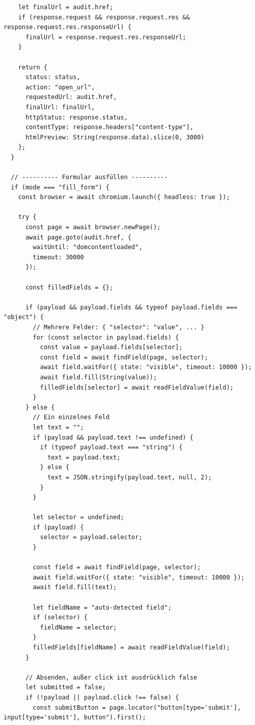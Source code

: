 \begin{lstlisting}
    let finalUrl = audit.href;
    if (response.request && response.request.res && response.request.res.responseUrl) {
      finalUrl = response.request.res.responseUrl;
    }

    return {
      status: status,
      action: "open_url",
      requestedUrl: audit.href,
      finalUrl: finalUrl,
      httpStatus: response.status,
      contentType: response.headers["content-type"],
      htmlPreview: String(response.data).slice(0, 3000)
    };
  }

  // ---------- Formular ausfüllen ----------
  if (mode === "fill_form") {
    const browser = await chromium.launch({ headless: true });

    try {
      const page = await browser.newPage();
      await page.goto(audit.href, {
        waitUntil: "domcontentloaded",
        timeout: 30000
      });

      const filledFields = {};

      if (payload && payload.fields && typeof payload.fields === "object") {
        // Mehrere Felder: { "selector": "value", ... }
        for (const selector in payload.fields) {
          const value = payload.fields[selector];
          const field = await findField(page, selector);
          await field.waitFor({ state: "visible", timeout: 10000 });
          await field.fill(String(value));
          filledFields[selector] = await readFieldValue(field);
        }
      } else {
        // Ein einzelnes Feld
        let text = "";
        if (payload && payload.text !== undefined) {
          if (typeof payload.text === "string") {
            text = payload.text;
          } else {
            text = JSON.stringify(payload.text, null, 2);
          }
        }

        let selector = undefined;
        if (payload) {
          selector = payload.selector;
        }

        const field = await findField(page, selector);
        await field.waitFor({ state: "visible", timeout: 10000 });
        await field.fill(text);

        let fieldName = "auto-detected field";
        if (selector) {
          fieldName = selector;
        }
        filledFields[fieldName] = await readFieldValue(field);
      }

      // Absenden, außer click ist ausdrücklich false
      let submitted = false;
      if (!payload || payload.click !== false) {
        const submitButton = page.locator("button[type='submit'], input[type='submit'], button").first();


\end{lstlisting}
